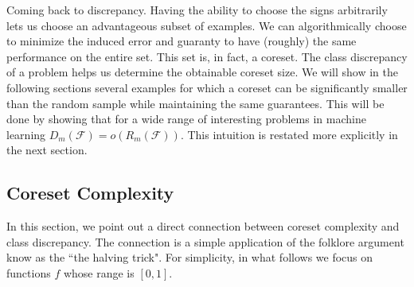 \documentclass[12pt]{colt2019} %
\newcommand{\F}{\mathcal{F}}
\begin{document}
Coming back to discrepancy. Having the ability to choose the signs arbitrarily lets us choose an advantageous subset of examples.
We can algorithmically choose to minimize the induced error and guaranty to have (roughly) the same performance on the entire set. 
This set is, in fact, a coreset. The class discrepancy of a problem helps us determine the obtainable coreset size. 
We will show in the following sections several examples for which a coreset can be significantly smaller than the random sample while maintaining the same guarantees. This will be done by showing that for a wide range of interesting problems in machine learning $D_m(\F) = o(R_m(\F))$.
This intuition is restated more explicitly in the next section.

\subsection{Coreset Complexity}
In this section, we point out a direct connection between coreset complexity and class discrepancy.
The connection is a simple application of the folklore argument know as the ``the halving trick".
For simplicity, in what follows we focus on functions $f$ whose range is $[0,1]$.
\end{document}
